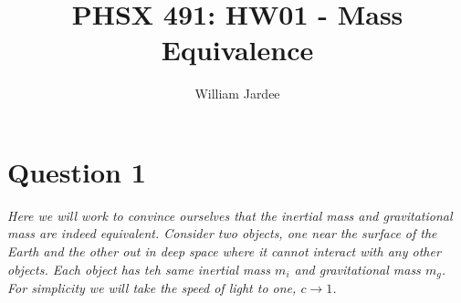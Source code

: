 \documentclass[12pt]{article}
\begin{document}
\title{PHSX 491: HW01 - Mass Equivalence}
\author{William Jardee}
\maketitle


\section*{Question 1}
{\sl Here we will work to convince ourselves that the inertial mass and gravitational mass are indeed equivalent. Consider two objects, one near the surface of the Earth and the other out in deep space where it cannot interact with any other objects. Each object has teh same inertial mass $m_i$ and gravitational mass $m_g$. For simplicity we will take the speed of light to one, $c \rightarrow 1$.}
\end{document}

